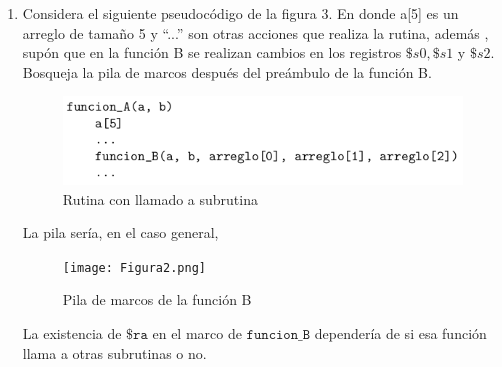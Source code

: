 \documentclass{article}
\begin{document}
\begin{enumerate}
{	
	}
	
		
	\item{
	Considera el siguiente pseudocódigo de la figura 3. En donde a[5] es un
	arreglo de tamaño 5 y “...” son otras acciones que realiza la rutina, además
	, supón que en la función B se realizan cambios en los registros $\$s0,
	\$s1$ y $\$s2$. Bosqueja la pila de marcos después del preámbulo de la 
	función B.
	
	\begin{figure}[H]
		\centering
		\includegraphics[scale=0.5]{Figura1.png}
		\caption{Rutina con llamado a subrutina}
	\end{figure}

	La pila sería, en el caso general,
	
	\begin{figure}[H]
		\centering
		\texttt{[image: Figura2.png]}
		\caption{Pila de marcos de la función B}
	\end{figure}
	}
	La existencia de $\texttt{\$ra}$ en el marco de $\texttt{funcion\_B}$
	dependería de si esa función llama a otras subrutinas o no.
    \end{enumerate}
\end{document}
